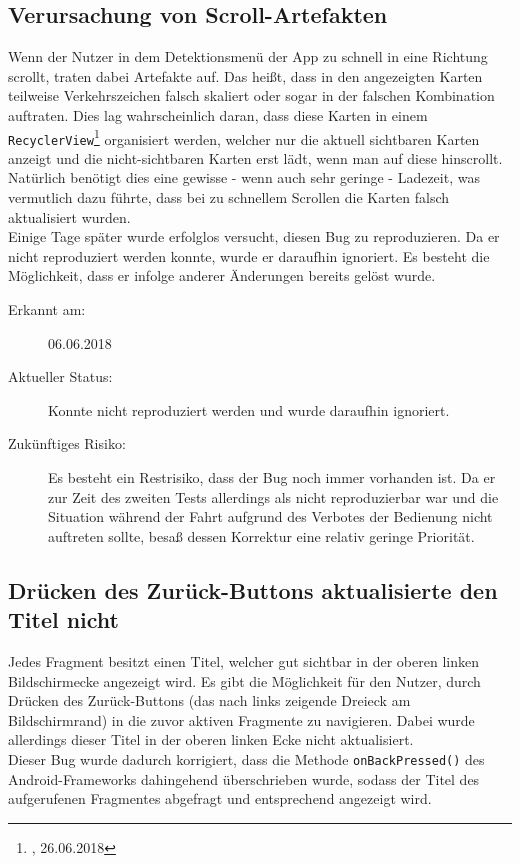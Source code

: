 \documentclass[12pt,a4paper,ngerman,enabledeprecatedfontcommands]{scrreprt}
\begin{document}
\subsection{Verursachung von Scroll-Artefakten}
Wenn der \gls{Nutzer} in dem Detektionsmenü der \gls{App} zu schnell in eine Richtung scrollt, traten dabei Artefakte auf. Das heißt, dass in den angezeigten Karten teilweise Verkehrszeichen falsch skaliert oder sogar in der falschen Kombination auftraten. Dies lag wahrscheinlich daran, dass diese Karten in einem \texttt{RecyclerView}\footnote{, 26.06.2018} organisiert werden, welcher nur die aktuell sichtbaren Karten anzeigt und die nicht-sichtbaren Karten erst lädt, wenn man auf diese hinscrollt. Natürlich benötigt dies eine gewisse - wenn auch sehr geringe - Ladezeit, was vermutlich dazu führte, dass bei zu schnellem Scrollen die Karten falsch aktualisiert wurden.\\
Einige Tage später wurde erfolglos versucht, diesen Bug zu reproduzieren. Da er nicht reproduziert werden konnte, wurde er daraufhin ignoriert. Es besteht die Möglichkeit, dass er infolge anderer Änderungen bereits gelöst wurde.

\begin{description}

    \item[Erkannt am:] 06.06.2018
    
    \item[Aktueller Status:] Konnte nicht reproduziert werden und wurde daraufhin ignoriert.
    
    \item[Zukünftiges Risiko:] Es besteht ein Restrisiko, dass der Bug noch immer vorhanden ist. Da er zur Zeit des zweiten Tests allerdings als nicht reproduzierbar war und die Situation während der Fahrt aufgrund des Verbotes der Bedienung nicht auftreten sollte, besaß dessen Korrektur eine relativ geringe Priorität.
    
\end{description}
\smallskip

\subsection{Drücken des Zurück-Buttons aktualisierte den Titel nicht}
Jedes Fragment besitzt einen Titel, welcher gut sichtbar in der oberen linken Bildschirmecke angezeigt wird. Es gibt die Möglichkeit für den \gls{Nutzer}, durch Drücken des Zurück-Buttons (das nach links zeigende Dreieck am Bildschirmrand) in die zuvor aktiven Fragmente zu navigieren. Dabei wurde allerdings dieser Titel in der oberen linken Ecke nicht aktualisiert.\\
Dieser Bug wurde dadurch korrigiert, dass die Methode \texttt{onBackPressed()} des Android-Frameworks dahingehend überschrieben wurde, sodass der Titel des aufgerufenen Fragmentes abgefragt und entsprechend angezeigt wird.
\end{document}
